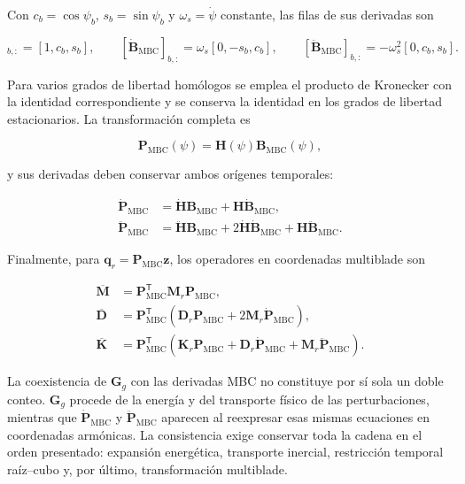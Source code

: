 Con $c_b=\cos\psi_b$, $s_b=\sin\psi_b$ y
$\omega_s=\dot\psi$ constante, las filas de sus derivadas son

\begin{equation}
 [\bm B_{\mathrm{MBC}}]_{b,:}=[1,c_b,s_b],\qquad
 [\dot{\bm B}_{\mathrm{MBC}}]_{b,:}
 =\omega_s[0,-s_b,c_b],\qquad
 [\ddot{\bm B}_{\mathrm{MBC}}]_{b,:}
 =-\omega_s^2[0,c_b,s_b].
 \label{prefgyro:Bmbc-derivadas}
\end{equation}

Para varios grados de libertad homólogos se emplea el producto de Kronecker
con la identidad correspondiente y se conserva la identidad en los grados de
libertad estacionarios. La transformación completa es

\begin{equation}
 \bm P_{\mathrm{MBC}}(\psi)
 =\bm H(\psi)\bm B_{\mathrm{MBC}}(\psi),
 \label{prefgyro:Pmbc}
\end{equation}

y sus derivadas deben conservar ambos orígenes temporales:

\begin{align}
 \dot{\bm P}_{\mathrm{MBC}}
 &=\dot{\bm H}\bm B_{\mathrm{MBC}}
 +\bm H\dot{\bm B}_{\mathrm{MBC}},
 \label{prefgyro:Pdot}\\
 \ddot{\bm P}_{\mathrm{MBC}}
 &=\ddot{\bm H}\bm B_{\mathrm{MBC}}
 +2\dot{\bm H}\dot{\bm B}_{\mathrm{MBC}}
 +\bm H\ddot{\bm B}_{\mathrm{MBC}}.
 \label{prefgyro:Pddot}
\end{align}

Finalmente, para $\bm q_r=\bm P_{\mathrm{MBC}}\bm z$, los operadores en
coordenadas multiblade son

\begin{align}
 \overline{\bm M}
 &=\bm P_{\mathrm{MBC}}^{\mathsf T}
 \bm M_r\bm P_{\mathrm{MBC}},
 \label{prefgyro:Mmbc}\\
 \overline{\bm D}
 &=\bm P_{\mathrm{MBC}}^{\mathsf T}
 \left(\bm D_r\bm P_{\mathrm{MBC}}
 +2\bm M_r\dot{\bm P}_{\mathrm{MBC}}\right),
 \label{prefgyro:Dmbc}\\
 \overline{\bm K}
 &=\bm P_{\mathrm{MBC}}^{\mathsf T}
 \left(\bm K_r\bm P_{\mathrm{MBC}}
 +\bm D_r\dot{\bm P}_{\mathrm{MBC}}
 +\bm M_r\ddot{\bm P}_{\mathrm{MBC}}\right).
 \label{prefgyro:Kmbc}
\end{align}

La coexistencia de $\bm G_g$ con las derivadas MBC no constituye por sí sola un
doble conteo. $\bm G_g$ procede de la energía y del transporte físico de las
perturbaciones, mientras que $\dot{\bm P}_{\mathrm{MBC}}$ y
$\ddot{\bm P}_{\mathrm{MBC}}$ aparecen al reexpresar esas mismas ecuaciones en
coordenadas armónicas. La consistencia exige conservar toda la cadena en el
orden presentado: expansión energética, transporte inercial, restricción
temporal raíz--cubo y, por último, transformación multiblade.
